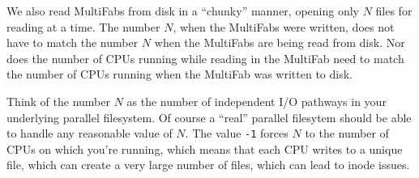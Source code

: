 We also read MultiFabs from disk in a ``chunky'' manner, opening only $N$
files for reading at a time.  The number $N$, when the MultiFabs were
written, does not have to match the number $N$ when the MultiFabs are
being read from disk.  Nor does the number of CPUs running while
reading in the MultiFab need to match the number of CPUs running when
the MultiFab was written to disk.

Think of the number $N$ as the number of independent I/O pathways in
your underlying parallel filesystem.  Of course a ``real'' parallel
filesytem should be able to handle any reasonable value of $N$.  The
value {\tt -1} forces $N$ to the number of CPUs on which you're
running, which means that each CPU writes to a unique file, which can
create a very large number of files, which can lead to inode issues.


